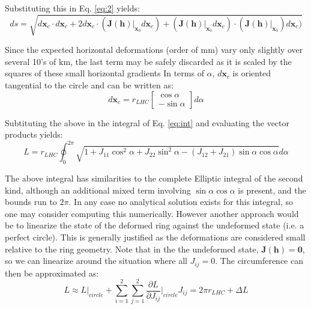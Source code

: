 \documentclass[a4paper,10pt,twoside,openany]{article}
\begin{document}
Substituting this in Eq. \ref{eq:2} yields:
\begin{equation}
ds = \sqrt{d\textbf{x}_{c}\cdot d\textbf{x}_{c} +2d\textbf{x}_{c}\cdot
  (\textbf{J}(\textbf{h})\bigg|_{\textbf{x}_{0}} d\textbf{x}_{c})
  +(\textbf{J}(\textbf{h})\bigg|_{\textbf{x}_{0}} d\textbf{x}_{c} )\cdot (\textbf{J}(\textbf{h})\bigg|_{\textbf{x}_{0}}) d\textbf{x}_{c})}
  \end{equation}

Since the expected horizontal deformations (order of mm) vary only
slightly over several 10's of km, the last term may be safely
discarded as it is scaled by the squares of these small horizontal gradients
In terms of $\alpha$, $d\textbf{x}_{c}$ is oriented tangential to the circle
and can be written as:
\begin{equation}
d\textbf{x}_{c}=r_{LHC}\left[\begin{array}{c}\cos\alpha\\-\sin\alpha\end{array}\right]d\alpha
\end{equation}

Subtituting the above in the integral of Eq. \ref{eq:int} and
evaluating the vector products yields:
\begin{equation}
  L =r_{LHC}\oint_{0}^{2\pi}
  \sqrt{1+J_{11}\cos^{2}\alpha+J_{22}\sin^{2}\alpha -(J_{12}+J_{21})\sin\alpha\cos\alpha} d\alpha 
\end{equation}

The above integral has similarities to the complete Elliptic integral
of the second kind, although an additional mixed term involving $\sin
\alpha\cos\alpha$ is present, and the bounds run to $2\pi$. In any
case no analytical solution exists for this integral, so one may
consider computing this numerically. However another approach would
be to linearize the state of the deformed ring against the undeformed
state (i.e. a perfect circle). This is generally justified as the
deformations are considered small relative to the ring geometry. Note
that in the the undeformed state, $\textbf{J}(\textbf{h})=\textbf{0}$,
so we can linearize around the situation where all $J_{ij}=0$.
The circumference can then be approximated as:
\begin{equation}
  L\approx L\bigg|_{circle}+\sum_{i=1}^{2}\sum_{j=1}^{2}\frac{\partial L
  }{\partial J_{ij}}\bigg|_{circle} J_{ij}=2\pi r_{LHC}+ \Delta L
  \end{equation}
\end{document}
